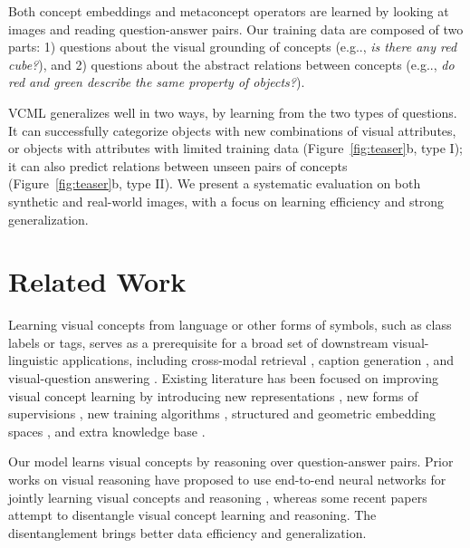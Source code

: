 \documentclass{article}
\makeatletter
\newcommand{\fig}[1]{Figure~\ref{#1}}
\DeclareRobustCommand\onedot{\futurelet\@let@token\@onedot}
\def\@onedot{\ifx\@let@token.\else.\null\fi\xspace}
\def\eg{e.g\onedot} \def\Eg{E.g\onedot}
\newcommand{\model}{VCML\xspace}
\makeatother
\begin{document}
Both concept embeddings and metaconcept operators are learned by looking at images and reading question-answer pairs.  Our training data are composed of two parts: 1) questions about the visual grounding of concepts (\eg, {\it is there any red cube?}), and 2) questions about the abstract relations between concepts (\eg, {\it do red and green describe the same property of objects?}). 


\model generalizes well in two ways, by learning from the two types of questions. It can successfully categorize objects with new combinations of visual attributes, or objects with attributes with limited training data (\fig{fig:teaser}b, type I); it can also predict relations between unseen pairs of concepts (\fig{fig:teaser}b, type II). We present a systematic evaluation on both synthetic and real-world images, with a focus on learning efficiency and strong generalization.






\section{Related Work}
Learning visual concepts from language or other forms of symbols, such as class labels or tags, serves as a prerequisite for a broad set of downstream visual-linguistic applications, including cross-modal retrieval \citep{Kiros2014Unifying}, caption generation \citep{Karpathy2015Deep}, and visual-question answering \citep{Malinowski2015Ask}. Existing literature has been focused on improving visual concept learning by introducing new representations \citep{Wu2017Neural}, new forms of supervisions \citep{Johnson2016DenseCap,Ganju2017What}, new training algorithms \citep{Faghri2018VSE,Shi2018Learning}, structured and geometric embedding spaces \citep{Ren2016Joint,Vendrov2015Order}, and extra knowledge base \citep{Thoma2017Towards}.

Our model learns visual concepts by reasoning over question-answer pairs. Prior works on visual reasoning have proposed to use end-to-end neural networks for jointly learning visual concepts and reasoning \citep{Malinowski2015Ask,Yang2016Stacked,Xu2016Ask,Andreas2016Learning,Gan2017Vqs,Mascharka2018Transparency,Hudson2018Compositional,Hu2018Explainable}, whereas some recent papers \citep{Yi2018NSVQA,Mao2019NeuroSymbolic,yi2019clevrer} attempt to disentangle visual concept learning and reasoning. The disentanglement brings better data efficiency and generalization.
\end{document}
